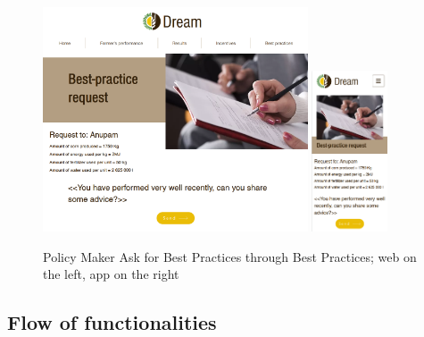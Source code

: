 \documentclass{article}
\begin{document}
        \begin{figure} [h]
            \centering
            \includegraphics[width=0.7\textwidth]{images/UserInterfaces/PolicyMaker/BestPractices/RequestBestPracticesWeb.png}
            \quad
            \includegraphics[width=0.2\textwidth]{images/UserInterfaces/PolicyMaker/BestPractices/RequestBestPracticesApp.png}
            \quad
            \caption{\label{fig:policyMakerAskBestPractices}Policy Maker Ask for Best Practices through Best Practices; web on the left, app on the right}
        \end{figure}
    
    
    \newpage
    \newpage
    
        
\newpage


    \subsection{Flow of functionalities}
    
\end{document}
